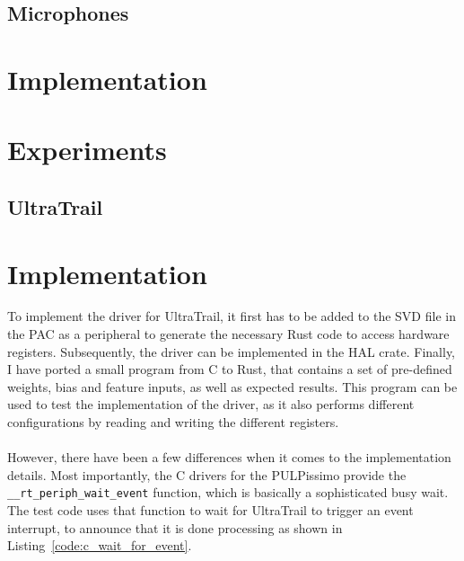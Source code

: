 

\subsection{Microphones}

\section{Implementation}

\section{Experiments}


\subsection{UltraTrail}

\section{Implementation}

To implement the driver for UltraTrail, it first has to be added to the SVD file in the PAC
as a peripheral to generate the necessary Rust code to access hardware registers.
Subsequently, the driver can be implemented in the HAL crate.
Finally, I have ported a small program from C to Rust, that contains a set of pre-defined
weights, bias and feature inputs, as well as expected results.
This program can be used to test the implementation of the driver, as it also
performs different configurations by reading and writing the different registers.
\\\\
However, there have been a few differences when it comes to the implementation details.
Most importantly, the C drivers for the PULPissimo provide the \lstinline{__rt_periph_wait_event} function,
which is basically a sophisticated busy wait.
The test code uses that function to wait for UltraTrail to trigger an event interrupt, to announce that
it is done processing as shown in Listing~\ref{code:c_wait_for_event}.


